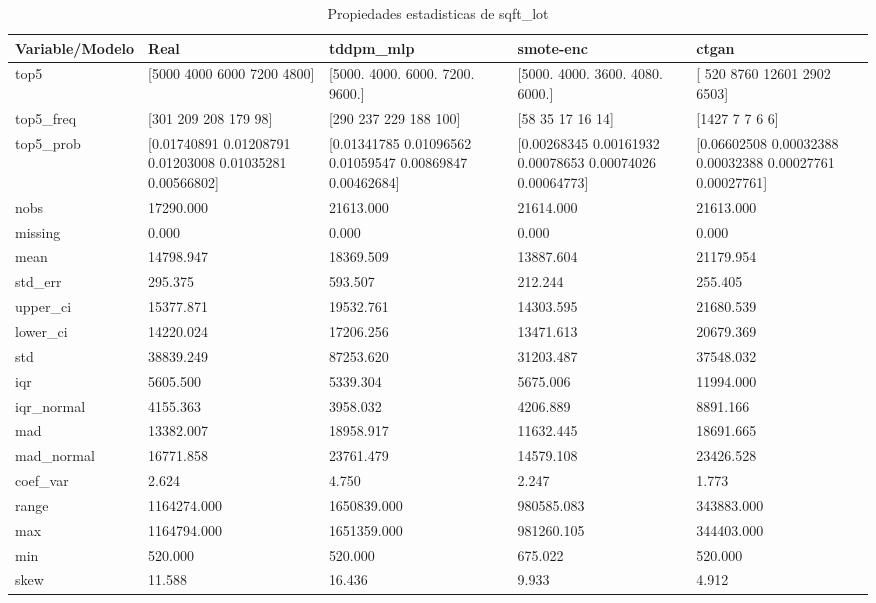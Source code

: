 \begin{table}[H]
\centering
\caption{Propiedades  estadisticas de sqft_lot}
\label{table-stats-sqft_lot}
\begin{tabular}{|l|m{10em}|m{10em}|m{10em}|m{10em}|}
\hline
 \rowcolor[gray]{0.8}
Variable/Modelo & Real & tddpm\_mlp & smote-enc & ctgan \\
\hline top5 & [5000 4000 6000 7200 4800] & [5000. 4000. 6000. 7200. 9600.] & [5000. 4000. 3600. 4080. 6000.] & [  520  8760 12601  2902  6503] \\
\hline top5\_freq & [301 209 208 179  98] & [290 237 229 188 100] & [58 35 17 16 14] & [1427    7    7    6    6] \\
\hline top5\_prob & [0.01740891 0.01208791 0.01203008 0.01035281 0.00566802] & [0.01341785 0.01096562 0.01059547 0.00869847 0.00462684] & [0.00268345 0.00161932 0.00078653 0.00074026 0.00064773] & [0.06602508 0.00032388 0.00032388 0.00027761 0.00027761] \\
\hline nobs & 17290.000 & 21613.000 & 21614.000 & 21613.000 \\
\hline missing & 0.000 & 0.000 & 0.000 & 0.000 \\
\hline mean & 14798.947 & 18369.509 & 13887.604 & 21179.954 \\
\hline std\_err & 295.375 & 593.507 & 212.244 & 255.405 \\
\hline upper\_ci & 15377.871 & 19532.761 & 14303.595 & 21680.539 \\
\hline lower\_ci & 14220.024 & 17206.256 & 13471.613 & 20679.369 \\
\hline std & 38839.249 & 87253.620 & 31203.487 & 37548.032 \\
\hline iqr & 5605.500 & 5339.304 & 5675.006 & 11994.000 \\
\hline iqr\_normal & 4155.363 & 3958.032 & 4206.889 & 8891.166 \\
\hline mad & 13382.007 & 18958.917 & 11632.445 & 18691.665 \\
\hline mad\_normal & 16771.858 & 23761.479 & 14579.108 & 23426.528 \\
\hline coef\_var & 2.624 & 4.750 & 2.247 & 1.773 \\
\hline range & 1164274.000 & 1650839.000 & 980585.083 & 343883.000 \\
\hline max & 1164794.000 & 1651359.000 & 981260.105 & 344403.000 \\
\hline min & 520.000 & 520.000 & 675.022 & 520.000 \\
\hline skew & 11.588 & 16.436 & 9.933 & 4.912 \\

\end{tabular}
\end{table}
